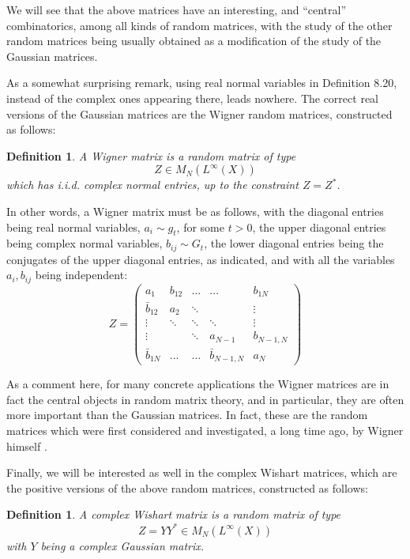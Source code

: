 \documentclass[12pt]{amsbook}
\newtheorem{definition}[theorem]{Definition}
\begin{document}
We will see that the above matrices have an interesting, and ``central'' combinatorics, among all kinds of random matrices, with the study of the other random matrices being usually obtained as a modification of the study of the Gaussian matrices.

\bigskip

As a somewhat surprising remark, using real normal variables in Definition 8.20, instead of the complex ones appearing there, leads nowhere. The correct real versions of the Gaussian matrices are the Wigner random matrices, constructed as follows: 


\begin{definition}
A Wigner matrix is a random matrix of type
$$Z\in M_N(L^\infty(X))$$
which has i.i.d. complex normal entries, up to the constraint $Z=Z^*$.
\end{definition}

In other words, a Wigner matrix must be as follows, with the diagonal entries being real normal variables, $a_i\sim g_t$, for some $t>0$, the upper diagonal entries being complex normal variables, $b_{ij}\sim G_t$, the lower diagonal entries being the conjugates of the upper diagonal entries, as indicated, and with all the variables $a_i,b_{ij}$ being independent: 
$$Z=\begin{pmatrix}
a_1&b_{12}&\ldots&\ldots&b_{1N}\\
\bar{b}_{12}&a_2&\ddots&&\vdots\\
\vdots&\ddots&\ddots&\ddots&\vdots\\
\vdots&&\ddots&a_{N-1}&b_{N-1,N}\\
\bar{b}_{1N}&\ldots&\ldots&\bar{b}_{N-1,N}&a_N
\end{pmatrix}$$

As a comment here, for many concrete applications the Wigner matrices are in fact the central objects in random matrix theory, and in particular, they are often more important than the Gaussian matrices. In fact, these are the random matrices which were first considered and investigated, a long time ago, by Wigner himself \cite{wig}.

\bigskip

Finally, we will be interested as well in the complex Wishart matrices, which are the positive versions of the above random matrices, constructed as follows: 


\begin{definition}
A complex Wishart matrix is a random matrix of type
$$Z=YY^*\in M_N(L^\infty(X))$$
with $Y$ being a complex Gaussian matrix.
\end{definition}
\end{document}
